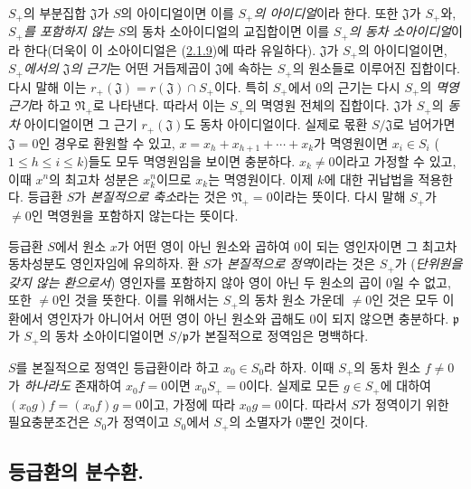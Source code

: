 \begin{env}[2.1.10]
\label{II.2.1.10-ko}
$S_+$의 부분집합 $\mathfrak{J}$가 $S$의 아이디얼이면 이를
\emph{$S_+$의 아이디얼}이라 한다. 또한 $\mathfrak{J}$가 $S_+$와,
\emph{$S_+$를 포함하지 않는} $S$의 동차 소아이디얼의 교집합이면 이를
\emph{$S_+$의 동차 소아이디얼}이라 한다(더욱이 이 소아이디얼은
(\hyperref[II.2.1.9-ko]{2.1.9})에 따라 유일하다). $\mathfrak{J}$가
$S_+$의 아이디얼이면, \emph{$S_+$에서의 $\mathfrak{J}$의 근기}는 어떤
거듭제곱이 $\mathfrak{J}$에 속하는 $S_+$의 원소들로 이루어진 집합이다.
다시 말해 이는 $r_+(\mathfrak{J})=r(\mathfrak{J})\cap S_+$이다. 특히
$S_+$에서 $0$의 근기는 다시 $S_+$의 \emph{멱영근기}라 하고
$\mathfrak{N}_+$로 나타낸다. 따라서 이는 $S_+$의 멱영원 전체의
집합이다. $\mathfrak{J}$가 $S_+$의 \emph{동차} 아이디얼이면 그 근기
$r_+(\mathfrak{J})$도 동차 아이디얼이다. 실제로 몫환
$S/\mathfrak{J}$로 넘어가면 $\mathfrak{J}=0$인 경우로 환원할 수 있고,
$x=x_h+x_{h+1}+\cdots+x_k$가 멱영원이면
$x_i\in S_i$ ($1\leq h\leq i\leq k$)들도 모두 멱영원임을 보이면
충분하다. $x_k\neq 0$이라고 가정할 수 있고, 이때 $x^n$의 최고차
성분은 $x_k^n$이므로 $x_k$는 멱영원이다. 이제 $k$에 대한 귀납법을
적용한다. 등급환 $S$가 \emph{본질적으로 축소}라는 것은
$\mathfrak{N}_+=0$이라는 뜻이다. 다시 말해 $S_+$가 $\neq 0$인 멱영원을
포함하지 않는다는 뜻이다.
\end{env}

\begin{env}[2.1.11]
\label{II.2.1.11-ko}
등급환 $S$에서 원소 $x$가 어떤 영이 아닌 원소와 곱하여 $0$이 되는
영인자이면 그 최고차 동차성분도 영인자임에 유의하자. 환 $S$가
\emph{본질적으로 정역}이라는 것은 $S_+$가
(\emph{단위원을 갖지 않는 환으로서}) 영인자를 포함하지 않아 영이 아닌
두 원소의 곱이 $0$일 수 없고, 또한 $\neq 0$인 것을 뜻한다. 이를 위해서는
$S_+$의 동차 원소 가운데 $\neq 0$인 것은 모두 이 환에서 영인자가 아니어서
어떤 영이 아닌 원소와 곱해도 $0$이 되지 않으면 충분하다.
$\mathfrak{p}$가 $S_+$의
동차 소아이디얼이면 $S/\mathfrak{p}$가 본질적으로 정역임은 명백하다.

$S$를 본질적으로 정역인 등급환이라 하고 $x_0\in S_0$라 하자. 이때
$S_+$의 동차 원소 $f\neq 0$가 \emph{하나라도} 존재하여
$x_0f=0$이면 $x_0S_+=0$이다. 실제로 모든 $g\in S_+$에
대하여 $(x_0g)f=(x_0f)g=0$이고, 가정에 따라 $x_0g=0$이다. 따라서
$S$가 정역이기 위한 필요충분조건은 $S_0$가 정역이고 $S_0$에서
$S_+$의 소멸자가 $0$뿐인 것이다.
\end{env}

\subsection{등급환의 분수환.}
\label{subsection:II.2.2-ko}

